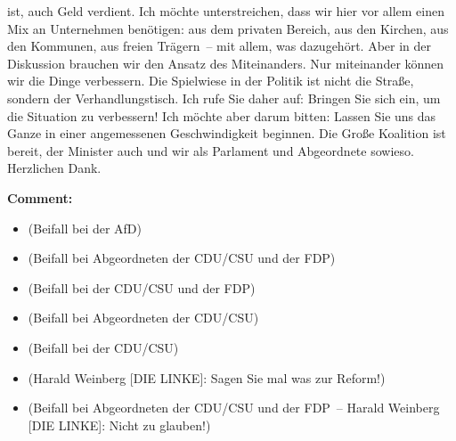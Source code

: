 \documentclass{article}
\begin{document}
ist, auch Geld verdient.  Ich möchte unterstreichen, dass wir hier vor allem einen Mix an Unternehmen benötigen: aus dem privaten Bereich, aus den Kirchen, aus den Kommunen, aus freien Trägern – mit allem, was dazugehört. Aber in der Diskussion brauchen wir den Ansatz des Miteinanders. Nur miteinander können wir die Dinge verbessern. Die Spielwiese in der Politik ist nicht die Straße, sondern der Verhandlungstisch. Ich rufe Sie daher auf: Bringen Sie sich ein, um die Situation zu verbessern!  Ich möchte aber darum bitten: Lassen Sie uns das Ganze in einer angemessenen Geschwindigkeit beginnen. Die Große Koalition ist bereit, der Minister auch und wir als Parlament und Abgeordnete sowieso. Herzlichen Dank.  

\noindent\textbf{Comment:}
\begin{itemize}
    \setlength\itemsep{-3pt}
    \item (Beifall bei der AfD)
    \setlength\itemsep{-3pt}
    \item (Beifall bei Abgeordneten der CDU/CSU und der FDP)
    \setlength\itemsep{-3pt}
    \item (Beifall bei der CDU/CSU und der FDP)
    \setlength\itemsep{-3pt}
    \item (Beifall bei Abgeordneten der CDU/CSU)
    \setlength\itemsep{-3pt}
    \item (Beifall bei der CDU/CSU)
    \setlength\itemsep{-3pt}
    \item (Harald Weinberg [DIE LINKE]: Sagen Sie mal was zur Reform!)
    \setlength\itemsep{-3pt}
    \item (Beifall bei Abgeordneten der CDU/CSU und der FDP – Harald Weinberg [DIE LINKE]: Nicht zu glauben!)
\end{itemize}
\end{document}
